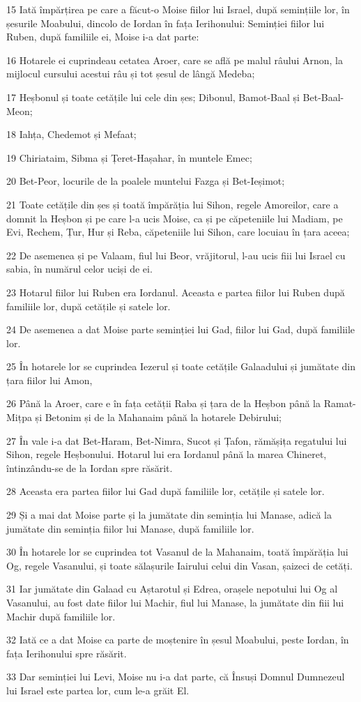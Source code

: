 \par 15 Iată împărțirea pe care a făcut-o Moise fiilor lui Israel, după semințiile lor, în șesurile Moabului, dincolo de Iordan în fața Ierihonului: Seminției fiilor lui Ruben, după familiile ei, Moise i-a dat parte:
\par 16 Hotarele ei cuprindeau cetatea Aroer, care se află pe malul râului Arnon, la mijlocul cursului acestui râu și tot șesul de lângă Medeba;
\par 17 Heșbonul și toate cetățile lui cele din șes; Dibonul, Bamot-Baal și Bet-Baal-Meon;
\par 18 Iahța, Chedemot și Mefaat;
\par 19 Chiriataim, Sibma și Țeret-Hașahar, în muntele Emec;
\par 20 Bet-Peor, locurile de la poalele muntelui Fazga și Bet-Ieșimot;
\par 21 Toate cetățile din șes și toată împărăția lui Sihon, regele Amoreilor, care a domnit la Heșbon și pe care l-a ucis Moise, ca și pe căpeteniile lui Madiam, pe Evi, Rechem, Țur, Hur și Reba, căpeteniile lui Sihon, care locuiau în țara aceea;
\par 22 De asemenea și pe Valaam, fiul lui Beor, vrăjitorul, l-au ucis fiii lui Israel cu sabia, în numărul celor uciși de ei.
\par 23 Hotarul fiilor lui Ruben era Iordanul. Aceasta e partea fiilor lui Ruben după familiile lor, după cetățile și satele lor.
\par 24 De asemenea a dat Moise parte seminției lui Gad, fiilor lui Gad, după familiile lor.
\par 25 În hotarele lor se cuprindea Iezerul și toate cetățile Galaadului și jumătate din țara fiilor lui Amon,
\par 26 Până la Aroer, care e în fața cetății Raba și țara de la Heșbon până la Ramat-Mițpa și Betonim și de la Mahanaim până la hotarele Debirului;
\par 27 În vale i-a dat Bet-Haram, Bet-Nimra, Sucot și Țafon, rămășița regatului lui Sihon, regele Heșbonului. Hotarul lui era Iordanul până la marea Chineret, întinzându-se de la Iordan spre răsărit.
\par 28 Aceasta era partea fiilor lui Gad după familiile lor, cetățile și satele lor.
\par 29 Și a mai dat Moise parte și la jumătate din seminția lui Manase, adică la jumătate din seminția fiilor lui Manase, după familiile lor.
\par 30 În hotarele lor se cuprindea tot Vasanul de la Mahanaim, toată împărăția lui Og, regele Vasanului, și toate sălașurile Iairului celui din Vasan, șaizeci de cetăți.
\par 31 Iar jumătate din Galaad cu Aștarotul și Edrea, orașele nepotului lui Og al Vasanului, au fost date fiilor lui Machir, fiul lui Manase, la jumătate din fiii lui Machir după familiile lor.
\par 32 Iată ce a dat Moise ca parte de moștenire în șesul Moabului, peste Iordan, în fața Ierihonului spre răsărit.
\par 33 Dar seminției lui Levi, Moise nu i-a dat parte, că Însuși Domnul Dumnezeul lui Israel este partea lor, cum le-a grăit El.


